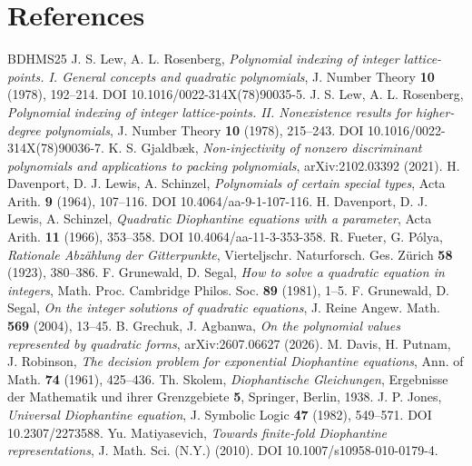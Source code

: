\section*{References}
\renewcommand{\refname}{}
\vspace{-\baselineskip}
\begin{thebibliography}{BDHMS25}
 J. S. Lew, A. L. Rosenberg, \emph{Polynomial indexing of integer lattice-points. I. General concepts and quadratic polynomials}, J. Number Theory \textbf{10} (1978), 192--214. DOI 10.1016/0022-314X(78)90035-5.
 J. S. Lew, A. L. Rosenberg, \emph{Polynomial indexing of integer lattice-points. II. Nonexistence results for higher-degree polynomials}, J. Number Theory \textbf{10} (1978), 215--243. DOI 10.1016/0022-314X(78)90036-7.
 K. S. Gjaldb\ae k, \emph{Non-injectivity of nonzero discriminant polynomials and applications to packing polynomials}, arXiv:2102.03392 (2021).
 H. Davenport, D. J. Lewis, A. Schinzel, \emph{Polynomials of certain special types}, Acta Arith. \textbf{9} (1964), 107--116. DOI 10.4064/aa-9-1-107-116.
 H. Davenport, D. J. Lewis, A. Schinzel, \emph{Quadratic Diophantine equations with a parameter}, Acta Arith. \textbf{11} (1966), 353--358. DOI 10.4064/aa-11-3-353-358.
 R. Fueter, G. P\'olya, \emph{Rationale Abz\"ahlung der Gitterpunkte}, Vierteljschr. Naturforsch. Ges. Z\"urich \textbf{58} (1923), 380--386.
 F. Grunewald, D. Segal, \emph{How to solve a quadratic equation in integers}, Math. Proc. Cambridge Philos. Soc. \textbf{89} (1981), 1–5.
 F. Grunewald, D. Segal, \emph{On the integer solutions of quadratic equations}, J. Reine Angew. Math. \textbf{569} (2004), 13–45.
 B. Grechuk, J. Agbanwa, \emph{On the polynomial values represented by quadratic forms}, arXiv:2607.06627 (2026).
 M. Davis, H. Putnam, J. Robinson, \emph{The decision problem for exponential Diophantine equations}, Ann. of Math. \textbf{74} (1961), 425–436.
 Th. Skolem, \emph{Diophantische Gleichungen}, Ergebnisse der Mathematik und ihrer Grenzgebiete \textbf{5}, Springer, Berlin, 1938.
 J. P. Jones, \emph{Universal Diophantine equation}, J. Symbolic Logic \textbf{47} (1982), 549–571. DOI 10.2307/2273588.
 Yu. Matiyasevich, \emph{Towards finite-fold Diophantine representations}, J. Math. Sci. (N.Y.) (2010). DOI 10.1007/s10958-010-0179-4.

\end{thebibliography}
